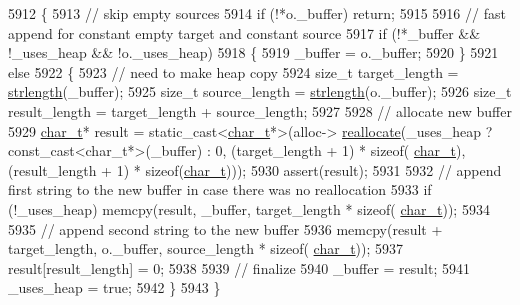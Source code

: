 \begin{DoxyCode}
5912         \{
5913             \textcolor{comment}{// skip empty sources}
5914             \textcolor{keywordflow}{if} (!*o.\_buffer) \textcolor{keywordflow}{return};
5915 
5916             \textcolor{comment}{// fast append for constant empty target and constant source}
5917             \textcolor{keywordflow}{if} (!*\_buffer && !\_uses\_heap && !o.\_uses\_heap)
5918             \{
5919                 \_buffer = o.\_buffer;
5920             \}
5921             \textcolor{keywordflow}{else}
5922             \{
5923                 \textcolor{comment}{// need to make heap copy}
5924                 \textcolor{keywordtype}{size\_t} target\_length = \hyperlink{pugixml_8cpp_aab9e1f034d085b663d146fcceabb1c48}{strlength}(\_buffer);
5925                 \textcolor{keywordtype}{size\_t} source\_length = \hyperlink{pugixml_8cpp_aab9e1f034d085b663d146fcceabb1c48}{strlength}(o.\_buffer);
5926                 \textcolor{keywordtype}{size\_t} result\_length = target\_length + source\_length;
5927 
5928                 \textcolor{comment}{// allocate new buffer}
5929                 \hyperlink{namespacepugi_aef5a7a62cba0507542220ea15afe39df}{char\_t}* result = \textcolor{keyword}{static\_cast<}\hyperlink{namespacepugi_aef5a7a62cba0507542220ea15afe39df}{char\_t}*\textcolor{keyword}{>}(alloc->
      \hyperlink{classxpath__allocator_a4dd502389202ec8e7420832112a571e5}{reallocate}(\_uses\_heap ? const\_cast<char\_t*>(\_buffer) : 0, (target\_length + 1) * \textcolor{keyword}{sizeof}(
      \hyperlink{namespacepugi_aef5a7a62cba0507542220ea15afe39df}{char\_t}), (result\_length + 1) * \textcolor{keyword}{sizeof}(\hyperlink{namespacepugi_aef5a7a62cba0507542220ea15afe39df}{char\_t})));
5930                 assert(result);
5931 
5932                 \textcolor{comment}{// append first string to the new buffer in case there was no reallocation}
5933                 \textcolor{keywordflow}{if} (!\_uses\_heap) memcpy(result, \_buffer, target\_length * \textcolor{keyword}{sizeof}(
      \hyperlink{namespacepugi_aef5a7a62cba0507542220ea15afe39df}{char\_t}));
5934 
5935                 \textcolor{comment}{// append second string to the new buffer}
5936                 memcpy(result + target\_length, o.\_buffer, source\_length * \textcolor{keyword}{sizeof}(
      \hyperlink{namespacepugi_aef5a7a62cba0507542220ea15afe39df}{char\_t}));
5937                 result[result\_length] = 0;
5938 
5939                 \textcolor{comment}{// finalize}
5940                 \_buffer = result;
5941                 \_uses\_heap = \textcolor{keyword}{true};
5942             \}
5943         \}
\end{DoxyCode}
